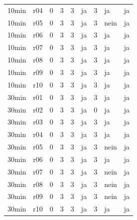 \begin{longtable}{llrrrrrll}
10min & r04 & 0 & 3 & 3 & ja & 3 & ja & ja \\
10min & r05 & 0 & 3 & 3 & ja & 3 & nein & ja \\
10min & r06 & 0 & 3 & 3 & ja & 3 & ja & ja \\
10min & r07 & 0 & 3 & 3 & ja & 3 & ja & ja \\
10min & r08 & 0 & 3 & 3 & ja & 3 & ja & ja \\
10min & r09 & 0 & 3 & 3 & ja & 3 & ja & ja \\
10min & r10 & 0 & 3 & 3 & ja & 3 & ja & ja \\
30min & r01 & 0 & 3 & 3 & ja & 3 & ja & ja \\
30min & r02 & 0 & 3 & 3 & ja & 0 & ja & ja \\
30min & r03 & 0 & 3 & 3 & ja & 3 & ja & ja \\
30min & r04 & 0 & 3 & 3 & ja & 3 & ja & ja \\
30min & r05 & 0 & 3 & 3 & ja & 3 & nein & ja \\
30min & r06 & 0 & 3 & 3 & ja & 3 & ja & ja \\
30min & r07 & 0 & 3 & 3 & ja & 3 & nein & ja \\
30min & r08 & 0 & 3 & 3 & ja & 3 & nein & ja \\
30min & r09 & 0 & 3 & 3 & ja & 3 & nein & ja \\
30min & r10 & 0 & 3 & 3 & ja & 3 & ja & ja \\
\bottomrule
\end{longtable}
